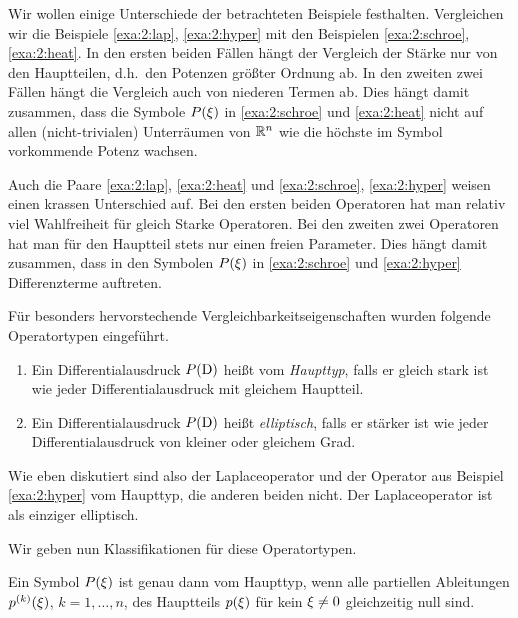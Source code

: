 Wir wollen einige Unterschiede der betrachteten Beispiele festhalten.
Vergleichen wir die Beispiele \ref{exa:2:lap}, \ref{exa:2:hyper}
mit den Beispielen \ref{exa:2:schroe}, \ref{exa:2:heat}.
In den ersten beiden Fällen hängt der Vergleich der Stärke nur von den Hauptteilen,
d.h.~den Potenzen größter Ordnung ab.
In den zweiten zwei Fällen hängt die Vergleich auch von niederen Termen ab.
Dies hängt damit zusammen, dass die Symbole $P(\xi)$ in
\ref{exa:2:schroe} und \ref{exa:2:heat} nicht auf allen (nicht-trivialen)
Unterräumen von $\mathbb R^n$ wie die höchste im Symbol vorkommende Potenz wachsen.

Auch die Paare \ref{exa:2:lap}, \ref{exa:2:heat}
und \ref{exa:2:schroe}, \ref{exa:2:hyper}
weisen einen krassen Unterschied auf.
Bei den ersten beiden Operatoren hat man relativ viel Wahlfreiheit
für gleich Starke Operatoren.
Bei den zweiten zwei Operatoren hat man für den Hauptteil stets
nur einen freien Parameter.
Dies hängt damit zusammen, dass in den Symbolen $P(\xi)$
in \ref{exa:2:schroe} und \ref{exa:2:hyper} Differenzterme auftreten.

Für besonders hervorstechende Vergleichbarkeitseigenschaften
wurden folgende Operatortypen eingeführt.

\begin{df}
\begin{enumerate}
\item
Ein Differentialausdruck $P(\mathrm D)$ heißt vom {\em Haupttyp},
falls er gleich stark ist wie jeder Differentialausdruck mit gleichem Hauptteil.
\item
Ein Differentialausdruck $P(\mathrm D)$ heißt {\em elliptisch},
falls er stärker ist wie jeder Differentialausdruck von kleiner oder gleichem Grad.
\end{enumerate}
\end{df}

Wie eben diskutiert sind also der Laplaceoperator
und der Operator aus Beispiel \ref{exa:2:hyper} vom Haupttyp,
die anderen beiden nicht.
Der Laplaceoperator ist als einziger elliptisch.

Wir geben nun Klassifikationen
für diese Operatortypen.

\begin{thm}\label{thm:2:2.9}
Ein Symbol $P(\xi)$ ist genau dann vom Haupttyp,
wenn alle partiellen Ableitungen $p^{(k)}(\xi)$, $k=1,\dots,n$,
des Hauptteils $p(\xi)$ für kein $\xi\neq0$
gleichzeitig null sind.
\end{thm}

